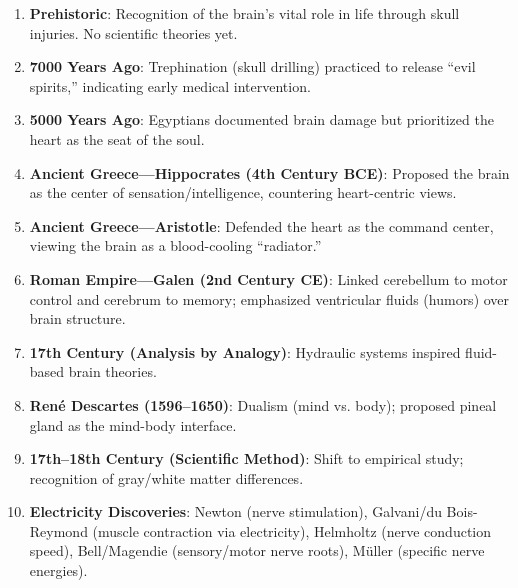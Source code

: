 \begin{enumerate}
    \item \textbf{Prehistoric}: Recognition of the brain's vital role in life through skull injuries. No scientific theories yet.

    \item \textbf{7000 Years Ago}: Trephination (skull drilling) practiced to release ``evil spirits,'' indicating early medical intervention.

    \item \textbf{5000 Years Ago}: Egyptians documented brain damage but prioritized the heart as the seat of the soul.

    \item \textbf{Ancient Greece—Hippocrates (4th Century BCE)}: Proposed the brain as the center of sensation/intelligence, countering heart-centric views.

    \item \textbf{Ancient Greece—Aristotle}: Defended the heart as the command center, viewing the brain as a blood-cooling ``radiator.''

    \item \textbf{Roman Empire—Galen (2nd Century CE)}: Linked cerebellum to motor control and cerebrum to memory; emphasized ventricular fluids (humors) over brain structure.

    \item \textbf{17th Century (Analysis by Analogy)}: Hydraulic systems inspired fluid-based brain theories.

    \item \textbf{René Descartes (1596–1650)}: Dualism (mind vs. body); proposed pineal gland as the mind-body interface.

    \item \textbf{17th–18th Century (Scientific Method)}: Shift to empirical study; recognition of gray/white matter differences.

    \item \textbf{Electricity Discoveries}: Newton (nerve stimulation), Galvani/du Bois-Reymond (muscle contraction via electricity), Helmholtz (nerve conduction speed), Bell/Magendie (sensory/motor nerve roots), Müller (specific nerve energies).


\end{enumerate}

